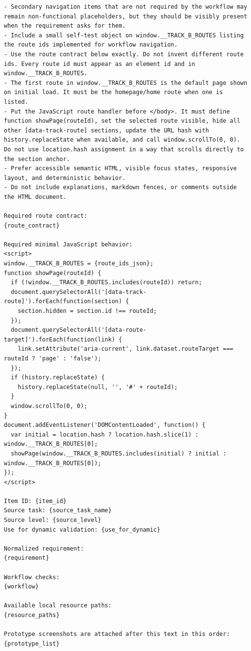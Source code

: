 \begin{verbatim}
- Secondary navigation items that are not required by the workflow may remain non-functional placeholders, but they should be visibly present when the requirement asks for them.
- Include a small self-test object on window.__TRACK_B_ROUTES listing the route ids implemented for workflow navigation.
- Use the route contract below exactly. Do not invent different route ids. Every route id must appear as an element id and in window.__TRACK_B_ROUTES.
- The first route in window.__TRACK_B_ROUTES is the default page shown on initial load. It must be the homepage/home route when one is listed.
- Put the JavaScript route handler before </body>. It must define function showPage(routeId), set the selected route visible, hide all other [data-track-route] sections, update the URL hash with history.replaceState when available, and call window.scrollTo(0, 0). Do not use location.hash assignment in a way that scrolls directly to the section anchor.
- Prefer accessible semantic HTML, visible focus states, responsive layout, and deterministic behavior.
- Do not include explanations, markdown fences, or comments outside the HTML document.

Required route contract:
{route_contract}

Required minimal JavaScript behavior:
<script>
window.__TRACK_B_ROUTES = {route_ids_json};
function showPage(routeId) {
  if (!window.__TRACK_B_ROUTES.includes(routeId)) return;
  document.querySelectorAll('[data-track-route]').forEach(function(section) {
    section.hidden = section.id !== routeId;
  });
  document.querySelectorAll('[data-route-target]').forEach(function(link) {
    link.setAttribute('aria-current', link.dataset.routeTarget === routeId ? 'page' : 'false');
  });
  if (history.replaceState) {
    history.replaceState(null, '', '#' + routeId);
  }
  window.scrollTo(0, 0);
}
document.addEventListener('DOMContentLoaded', function() {
  var initial = location.hash ? location.hash.slice(1) : window.__TRACK_B_ROUTES[0];
  showPage(window.__TRACK_B_ROUTES.includes(initial) ? initial : window.__TRACK_B_ROUTES[0]);
});
</script>

Item ID: {item_id}
Source task: {source_task_name}
Source level: {source_level}
Use for dynamic validation: {use_for_dynamic}

Normalized requirement:
{requirement}

Workflow checks:
{workflow}

Available local resource paths:
{resource_paths}

Prototype screenshots are attached after this text in this order:
{prototype_list}
\end{verbatim}
\endgroup

